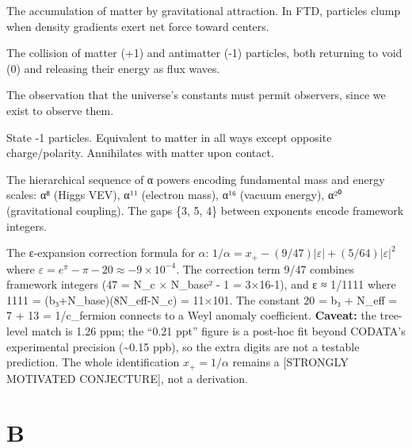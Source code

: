 \documentclass[
  11pt,
  letterpaper,
  twoside,
  openany]{book}
\makeatletter
\providecommand{\tightlist}{%
  \setlength{\itemsep}{0pt}\setlength{\parskip}{0pt}}
\let\orig@section\section
\renewcommand{\section}{\needspace{8\baselineskip}\orig@section}
\makeatother
\begin{document}
\begin{description}
\tightlist
\item[\textbf{Accretion}]
The accumulation of matter by gravitational attraction. In FTD,
particles clump when density gradients exert net force toward centers.
\item[\textbf{Annihilation}]
The collision of matter (+1) and antimatter (-1) particles, both
returning to void (0) and releasing their energy as flux waves.
\item[\textbf{Anthropic Principle}]
The observation that the universe's constants must permit observers,
since we exist to observe them.
\item[\textbf{Antimatter}]
State -1 particles. Equivalent to matter in all ways except opposite
charge/polarity. Annihilates with matter upon contact.
\item[\textbf{Alpha Power Ladder}]
The hierarchical sequence of α powers encoding fundamental mass and
energy scales: α⁸ (Higgs VEV), α¹¹ (electron mass), α¹⁶ (vacuum energy),
α²⁰ (gravitational coupling). The gaps \{3, 5, 4\} between exponents
encode framework integers.
\item[\textbf{Alpha Precision Formula}]
The ε-expansion correction formula for \(\alpha\):
\(1/\alpha = x_+ - (9/47)|\varepsilon| + (5/64)|\varepsilon|^2\) where
\(\varepsilon = e^\pi - \pi - 20 \approx -9 \times 10^{-4}\). The
correction term 9/47 combines framework integers (47 = N\_c × N\_base² -
1 = 3×16-1), and \textbar ε\textbar{} ≈ 1/1111 where 1111 =
(b₃+N\_base)(8N\_eff-N\_c) = 11×101. The constant 20 = b₃ + N\_eff = 7 +
13 = 1/c\_fermion connects to a Weyl anomaly coefficient.
\textbf{Caveat:} the tree-level match is 1.26 ppm; the ``0.21 ppt''
figure is a post-hoc fit beyond CODATA's experimental precision
(\textasciitilde0.15 ppb), so the extra digits are not a testable
prediction. The whole identification \(x_+ = 1/\alpha\) remains a
{[}STRONGLY MOTIVATED CONJECTURE{]}, not a derivation.
\end{description}

\section{B}\label{b}
\end{document}
